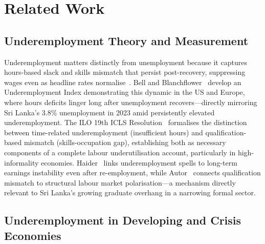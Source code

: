 \documentclass[sigconf]{acmart}
\begin{document}
\section{Related Work}

\subsection{Underemployment Theory and Measurement}
 
Underemployment matters distinctly from unemployment because it captures
hours-based slack and skills mismatch that persist post-recovery,
suppressing wages even as headline rates normalise~\cite{bell2018underemployment,ilo2013}.
Bell and Blanchflower~\cite{bell2018underemployment} develop an
Underemployment Index demonstrating this dynamic in the US and Europe,
where hours deficits linger long after unemployment recovers---directly
mirroring Sri Lanka's 3.8\% unemployment in 2023 amid persistently
elevated underemployment. The ILO 19th ICLS Resolution~\cite{ilo2013}
formalises the distinction between time-related underemployment (insufficient
hours) and qualification-based mismatch (skills-occupation gap), establishing
both as necessary components of a complete labour underutilisation account,
particularly in high-informality economies. Haider~\cite{haider2001} links
underemployment spells to long-term earnings instability even after
re-employment, while Autor~\cite{autor2014} connects qualification mismatch
to structural labour market polarisation---a mechanism directly relevant to
Sri Lanka's growing graduate overhang in a narrowing formal sector.
 
\subsection{Underemployment in Developing and Crisis Economies}
 
\end{document}
